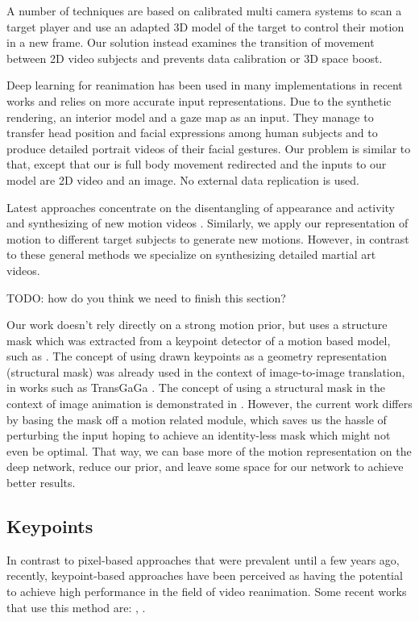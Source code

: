 \documentclass{article}
\begin{document}
A number of techniques are based on calibrated multi camera systems to scan a target player and use an adapted 3D model of the target to control their motion in a new frame\cite{cheung2004markerless}. Our solution instead examines the transition of movement between 2D video subjects and prevents data calibration or 3D space boost.

Deep learning for reanimation has been used in many implementations in recent works and relies on more accurate input representations. Due to the synthetic rendering, an interior model and a gaze map as an input. They manage to transfer head position and facial expressions among human subjects and to produce detailed portrait videos of their facial gestures\cite{kim2018deep}. Our problem is similar to that, except that our is full body movement  redirected and the inputs to our model are 2D video and an image. No external data replication is used.

Latest approaches concentrate on the disentangling of appearance and activity and synthesizing of new motion videos \cite{tulyakov2018mocogan}. Similarly, we apply
our representation of motion to different target subjects to
generate new motions. However, in contrast to these  general methods we specialize on synthesizing detailed martial art videos.

TODO: how do you think we need to finish this section?

Our work doesn't rely directly on a strong motion prior,
but uses a structure mask which was extracted from a keypoint detector
of a motion based model, such as \cite{siarohin2020order}. The concept of using drawn keypoints as
a geometry representation (structural mask) was already used in the context
of image-to-image translation, in works such as TransGaGa \cite{wu2019transgaga}.
The concept of using a structural mask in the context of image animation is
demonstrated in \cite{shalev2020image}. However, the current work differs
by basing the mask off a motion related module, which saves us the hassle
of perturbing the input hoping to achieve an identity-less mask which might
not even be optimal. That way, we
can base more of the motion representation on the deep network, reduce our
prior, and leave some space for our network to achieve better results.


\subsection{Keypoints}
In contrast to pixel-based approaches that were prevalent until a few years
ago, recently, keypoint-based approaches have been perceived as having the
potential to achieve high performance in the field of video reanimation. Some recent works that use this method are:
\cite{kim2019unsupervised}, \cite{balakrishnan2018synthesizing}
\cite{ma2017pose}  \cite{reed2017parallel} \cite{chan2019everybody}
\cite{villegas2017learning}
\cite{cai2018deep}
\cite{wang2018every}
\cite{reed2015deep}.
\end{document}
